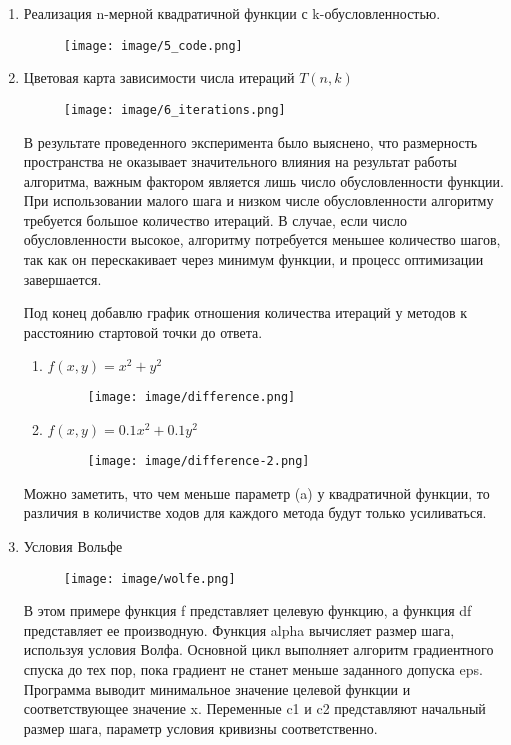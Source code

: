 \documentclass[12pt, a4paper]{article}
\begin{document}
\begin{enumerate}
\item Реализация n-мерной квадратичной функции с k-обусловленностью.

\begin{figure}[h]
\centering
\texttt{[image: image/5\_code.png]}
\end{figure}

\item Цветовая карта зависимости числа итераций $T(n,k)$

\begin{figure}[h]
\centering
\texttt{[image: image/6\_iterations.png]}
\end{figure}

В результате проведенного эксперимента было выяснено, что размерность пространства не оказывает значительного влияния на результат работы алгоритма, важным фактором является лишь число обусловленности функции. При использовании малого шага и низком числе обусловленности алгоритму требуется большое количество итераций. В случае, если число обусловленности высокое, алгоритму потребуется меньшее количество шагов, так как он перескакивает через минимум функции, и процесс оптимизации завершается.

Под конец добавлю график отношения количества итераций у методов к расстоянию стартовой точки до ответа.

\newpage

\begin{enumerate}
    \item $f(x, y) = x^2 + y^2$
    \begin{figure}[h]
    \centering
    \texttt{[image: image/difference.png]}
    \end{figure}
    
    \item $f(x, y) = 0.1x^2 + 0.1y^2$
    \begin{figure}[h]
    \centering
    \texttt{[image: image/difference-2.png]}
    \end{figure}
\end{enumerate}

Можно заметить, что чем меньше параметр (a) у квадратичной функции, то различия в количистве ходов для каждого метода будут только усиливаться.

\newpage
\item Условия Вольфе
\begin{figure}[h]
\centering
\texttt{[image: image/wolfe.png]}
\end{figure}

В этом примере функция f представляет целевую функцию, а функция df представляет ее производную. Функция alpha вычисляет размер шага, используя условия Волфа. Основной цикл выполняет алгоритм градиентного спуска до тех пор, пока градиент не станет меньше заданного допуска eps. Программа выводит минимальное значение целевой функции и соответствующее значение x. Переменные c1 и c2 представляют начальный размер шага, параметр условия кривизны соответственно.

\end{enumerate}
\end{document}
